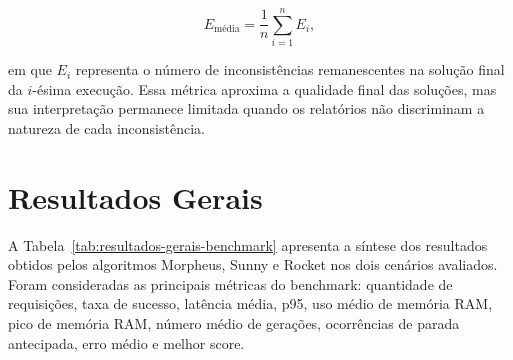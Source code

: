 \begin{equation}
E_{\text{média}} = \frac{1}{n}\sum_{i=1}^{n} E_i,
\end{equation}

em que \(E_i\) representa o número de inconsistências remanescentes na solução final da \(i\)-ésima execução. Essa métrica aproxima a qualidade final das soluções, mas sua interpretação permanece limitada quando os relatórios não discriminam a natureza de cada inconsistência.

\section{Resultados Gerais}
\label{sec:resultados-gerais}

A Tabela~\ref{tab:resultados-gerais-benchmark} apresenta a síntese dos resultados obtidos pelos algoritmos Morpheus, Sunny e Rocket nos dois cenários avaliados. Foram consideradas as principais métricas do benchmark: quantidade de requisições, taxa de sucesso, latência média, p95, uso médio de memória RAM, pico de memória RAM, número médio de gerações, ocorrências de parada antecipada, erro médio e melhor score.

\begin{table}[H]
\centering
\caption{Resultados gerais do benchmark dos algoritmos Morpheus, Sunny e Rocket}
\label{tab:resultados-gerais-benchmark}
\scriptsize
{}
\fonteautores
\end{table}

